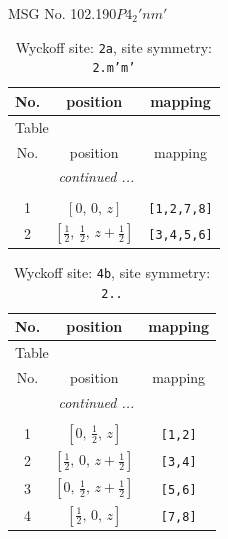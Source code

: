 \documentclass[fleqn,8pt]{jsarticle}
\begin{document}
\setcounter{MaxMatrixCols}{32}

\renewcommand{\tablename}{Table~}
\renewcommand{\figurename}{Figure~}
\begin{center}
\LARGE
MSG No. 102.190\quad$P4_{2}'nm'$
\end{center}
\renewcommand{\arraystretch}{1.2}
\begin{longtable}{ccc}
\caption{Wyckoff site: {\tt 2a}, site symmetry: {\tt 2.m'm'}}
 \\
 \hline \hline
No. & position & mapping \\ \hline \endfirsthead

\multicolumn{2}{l}{\tablename\ \thetable{}} \\
 \hline \hline
No. & position & mapping \\ \hline \endhead

 \hline \hline
\multicolumn{2}{r}{\footnotesize\it continued ...} \\ \endfoot

 \hline \hline
\multicolumn{2}{r}{} \\ \endlastfoot

1 & $\left[ 0,\, 0,\, z \right]$ & {\tt [1,2,7,8]} \\ \hline
2 & $\left[ \frac{1}{2},\, \frac{1}{2},\, z + \frac{1}{2} \right]$ & {\tt [3,4,5,6]} \\
\end{longtable}
\renewcommand{\arraystretch}{1.2}
\begin{longtable}{ccc}
\caption{Wyckoff site: {\tt 4b}, site symmetry: {\tt 2..}}
 \\
 \hline \hline
No. & position & mapping \\ \hline \endfirsthead

\multicolumn{2}{l}{\tablename\ \thetable{}} \\
 \hline \hline
No. & position & mapping \\ \hline \endhead

 \hline \hline
\multicolumn{2}{r}{\footnotesize\it continued ...} \\ \endfoot

 \hline \hline
\multicolumn{2}{r}{} \\ \endlastfoot

1 & $\left[ 0,\, \frac{1}{2},\, z \right]$ & {\tt [1,2]} \\ \hline
2 & $\left[ \frac{1}{2},\, 0,\, z + \frac{1}{2} \right]$ & {\tt [3,4]} \\ \hline
3 & $\left[ 0,\, \frac{1}{2},\, z + \frac{1}{2} \right]$ & {\tt [5,6]} \\ \hline
4 & $\left[ \frac{1}{2},\, 0,\, z \right]$ & {\tt [7,8]} \\
\end{longtable}
\end{document}

